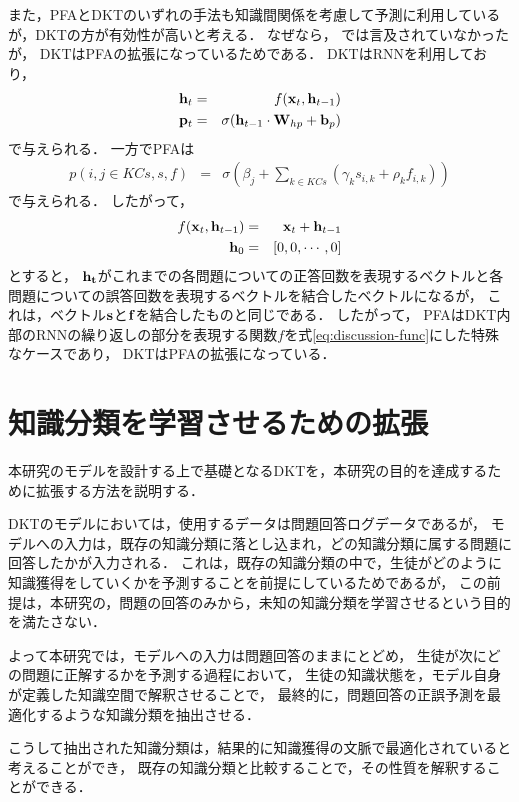 また，PFAとDKTのいずれの手法も知識間関係を考慮して予測に利用しているが，DKTの方が有効性が高いと考える．
なぜなら，
\cite{piech2015deep}では言及されていなかったが，
DKTはPFAの拡張になっているためである．
DKTはRNNを利用しており，
\begin{eqnarray}
{\bf h}_t & = & f({\bf x}_t, {\bf h}_{t-1})\\
{\bf p}_t & = & \sigma({\bf h}_{t-1} \cdot {\bf W}_{hp} + {\bf b}_p)
\end{eqnarray}
で与えられる．
一方でPFAは
\begin{eqnarray}
	p(i, j \in KCs, s, f) & = & \sigma( \beta _j + \sum_{k \in KCs}(\gamma_k s_{i, k} + \rho _k f_{i, k}) )
\end{eqnarray}
で与えられる．
したがって，
\begin{eqnarray}
\label{eq:discussion-func}
	f({\bf x}_t, {\bf h}_{t-1}) &=& {\bf x}_t + {\bf h}_{t-1}\\
	{\bf h}_{0} & = & [0, 0, \cdots , 0]
\end{eqnarray}
とすると，
${\bf h_t}$がこれまでの各問題についての正答回数を表現するベクトルと各問題についての誤答回数を表現するベクトルを結合したベクトルになるが， 
これは，ベクトル${\bf s}$と${\bf f}$を結合したものと同じである．
したがって，
PFAはDKT内部のRNNの繰り返しの部分を表現する関数$f$を式\ref{eq:discussion-func}にした特殊なケースであり，
DKTはPFAの拡張になっている．


\section{知識分類を学習させるための拡張}
本研究のモデルを設計する上で基礎となるDKTを，本研究の目的を達成するために拡張する方法を説明する．


DKTのモデルにおいては，使用するデータは問題回答ログデータであるが，
モデルへの入力は，既存の知識分類に落とし込まれ，どの知識分類に属する問題に回答したかが入力される．
これは，既存の知識分類の中で，生徒がどのように知識獲得をしていくかを予測することを前提にしているためであるが，
この前提は，本研究の，問題の回答のみから，未知の知識分類を学習させるという目的を満たさない．

よって本研究では，モデルへの入力は問題回答のままにとどめ，
生徒が次にどの問題に正解するかを予測する過程において，
生徒の知識状態を，モデル自身が定義した知識空間で解釈させることで，
最終的に，問題回答の正誤予測を最適化するような知識分類を抽出させる．

こうして抽出された知識分類は，結果的に知識獲得の文脈で最適化されていると考えることができ，
既存の知識分類と比較することで，その性質を解釈することができる．


